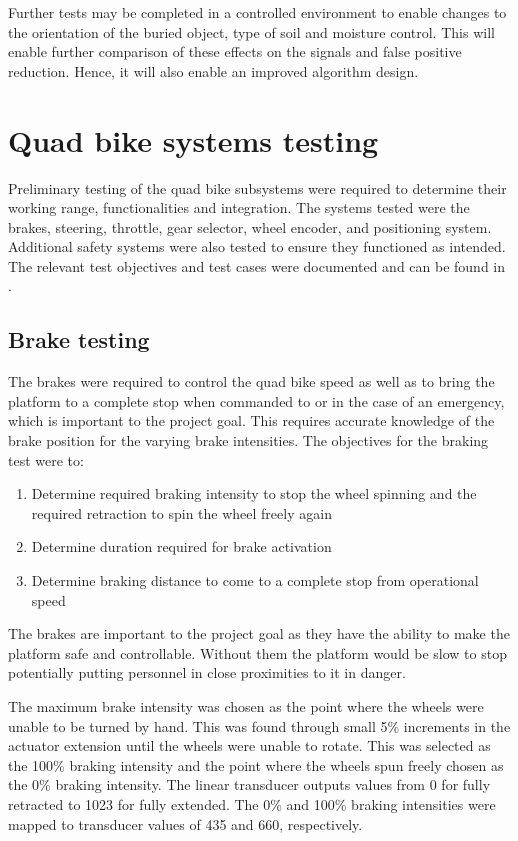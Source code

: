 \documentclass[main.tex]{subfiles}
\begin{document}
Further tests may be completed in a controlled environment to enable changes to the orientation of the buried object, type of soil and moisture control. This will enable further comparison of these effects on the signals and false positive reduction. Hence, it will also enable an improved algorithm design. 

\section{Quad bike systems testing}
Preliminary testing of the quad bike subsystems were required to determine their working range, functionalities and integration. The systems tested were the brakes, steering, throttle, gear selector, wheel encoder, and positioning system. Additional safety systems were also tested to ensure they functioned as intended.
The relevant test objectives and test cases were documented and can be found in .

\subsection{Brake testing}
The brakes were required to control the quad bike speed as well as to bring the platform to a complete stop when commanded to or in the case of an emergency, which is important to the project goal. This requires accurate knowledge of the brake position for the varying brake intensities. The objectives for the braking test were to:

\begin{enumerate}
\item Determine required braking intensity to stop the wheel spinning and the required retraction to spin the wheel freely again
\item Determine duration required for brake activation
\item Determine braking distance to come to a complete stop from operational speed  
\end{enumerate}

The brakes are important to the project goal as they have the ability to make the platform safe and controllable. Without them the platform would be slow to stop potentially putting personnel in close proximities to it in danger.

The maximum brake intensity was chosen as the point where the wheels were unable to be turned by hand. This was found through small 5\% increments in the actuator extension until the wheels were unable to rotate. This was selected as the 100\% braking intensity and the point where the wheels spun freely chosen as the 0\% braking intensity. The linear transducer outputs values from 0 for fully retracted to 1023 for fully extended. The 0\% and 100\% braking intensities were mapped to transducer values of 435 and 660, respectively.
\end{document}

